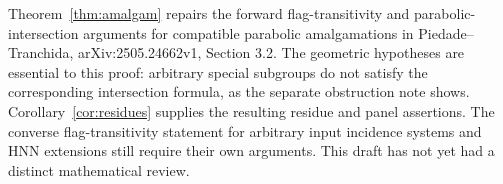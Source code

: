 Theorem~\ref{thm:amalgam} repairs the forward flag-transitivity and
parabolic-intersection arguments for compatible parabolic amalgamations
in Piedade--Tranchida, arXiv:2505.24662v1, Section 3.2. The geometric
hypotheses are essential to this proof: arbitrary special subgroups
do not satisfy the corresponding intersection formula, as the separate
obstruction note shows. Corollary~\ref{cor:residues} supplies the resulting
residue and panel assertions. The converse flag-transitivity statement
for arbitrary input incidence systems and HNN extensions still require
their own arguments. This
draft has not yet had a distinct mathematical review.


